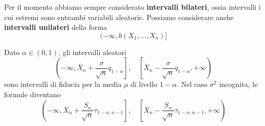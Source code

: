 Per il momento abbiamo sempre considerato \textbf{intervalli bilateri}, ossia intervalli i cui
estremi sono entrambi variabili aleatorie. Possiamo considerare anche \textbf{intervalli unilateri}
della forma
\[ (-\infty, b(X_1, \dots, X_n)] \]

\begin{proposition}
	Dato $\alpha \in (0,1)$, gli intervalli aleatori
	\[
		\left( -\infty, \overline{X}_n + \frac{\sigma}{\sqrt{n}} q_{1-\alpha} \right],
		\quad
		\left[ \overline{X}_n - \frac{\sigma}{\sqrt{n}} q_{1-\alpha}, +\infty \right)
	\]
	sono intervalli di fiducia per la media $\mu$ di livello $1-\alpha$. Nel caso $\sigma^2$
	incognita, le formule diventano
	\[
		\left( -\infty, \overline{X}_n + \frac{S_n}{\sqrt{n}} \tau_{1-\alpha, n-1} \right],
		\quad
		\left[ \overline{X}_n - \frac{S_n}{\sqrt{n}} \tau_{1-\alpha, n-1}, +\infty \right)
	\]
\end{proposition}